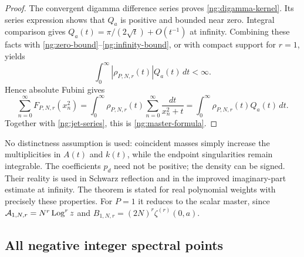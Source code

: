 \begin{proof}
The convergent digamma difference series proves
\eqref{ng:digamma-kernel}.  Its series expression shows that
$Q_a$ is positive and bounded near zero.  Integral comparison
gives $Q_a(t)=\pi/(2\sqrt t)+O(t^{-1})$ at infinity.
Combining these facts with
\eqref{ng:zero-bound}--\eqref{ng:infinity-bound}, or with compact
support for $r=1$, yields
\[
 \int_0^{\infty}|\rho_{P,N,r}(t)|Q_a(t)\,dt<\infty.
\]
Hence absolute Fubini gives
\[
 \sum_{n=0}^{\infty}F_{P,N,r}(x_n^2)
  =\int_0^{\infty}\rho_{P,N,r}(t)
                        \sum_{n=0}^{\infty}\frac{dt}{x_n^2+t}
  =\int_0^{\infty}\rho_{P,N,r}(t)Q_a(t)\,dt.
\]
Together with \eqref{ng:jet-series}, this is
\eqref{ng:master-formula}.
\end{proof}

\begin{remark}
\label{ng:collisions}
No distinctness assumption is used: coincident masses simply
increase the multiplicities in $A(t)$ and $k(t)$, while the
endpoint singularities remain integrable.  The coefficients
$p_d$ need not be positive; the density can be signed.
Their reality is used in Schwarz reflection and in the improved
imaginary-part estimate at infinity.  The theorem is stated for
real polynomial weights with precisely these properties.
For $P=1$ it reduces to the scalar master, since
$\mathcal A_{1,N,r}=N^r\operatorname{Log}^r z$ and
$B_{1,N,r}=(2N)^r\zeta^{(r)}(0,a)$.
\end{remark}


\subsection{All negative integer spectral points}
\label{ng:negative-subsection}


